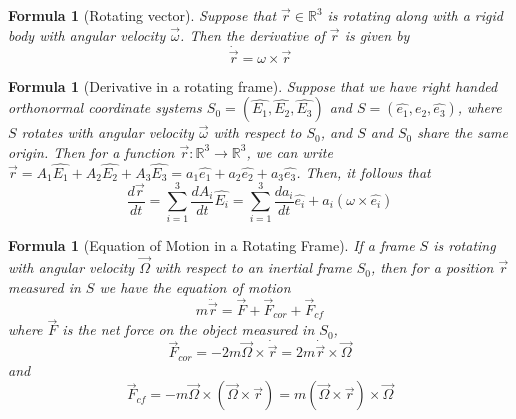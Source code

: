 \documentclass[12pt]{article}
\newtheorem{for}[thm]{Formula}
\theoremstyle{definition}
\theoremstyle{remark}
\numberwithin{equation}{section}
\newcommand\R{\mathbb R}    %
\begin{document}
\vspace{15pt}

\begin{for}[Rotating vector]
        Suppose that $\vec{r} \in \R^3$ is rotating along with a rigid body with angular velocity $\vec{\omega}$. Then the derivative of $\vec{r}$ is given by \begin{equation}
                \dot{\vec{r}} = \omega \times \vec{r}
        \end{equation}
\end{for}

\vspace{15pt}

\begin{for}[Derivative in a rotating frame]
        Suppose that we have right handed orthonormal coordinate systems $S_0 = (\hat{E_1}, \hat{E_2}, \hat{E_3})$ and $S = (\hat{e_1}, \hat{e_2}, \hat{e_3})$, where $S$ rotates with angular velocity $\vec{\omega}$ with respect to $S_0$, and $S$ and $S_0$ share the same origin. Then for a function $\vec{r}: \R^3\rightarrow \R^3$, we can write $\vec{r} = A_1\hat{E_1} + A_2\hat{E_2} + A_3\hat{E_3} = a_1\hat{e_1} + a_2\hat{e_2} + a_3\hat{e_3}$. Then, it follows that \begin{equation}
                \frac{d\vec{r}}{dt} = \sum\limits_{i=1}^3\frac{dA_i}{dt}\hat{E_i} = \sum\limits_{i=1}^3\frac{da_i}{dt}\hat{e_i} + a_i(\omega\times \hat{e_i})
        \end{equation}
\end{for}

\vspace{15pt}

\begin{for}[Equation of Motion in a Rotating Frame]
        If a frame $S$ is rotating with angular velocity $\vec{\Omega}$ with respect to an inertial frame $S_0$, then for a position $\vec{r}$ measured in $S$ we have the equation of motion \begin{equation}
                m\ddot{\vec{r}} = \vec{F} + \vec{F}_{cor} + \vec{F}_{cf}
        \end{equation}
        where $\vec{F}$ is the net force on the object measured in $S_0$, \begin{equation}
                \vec{F}_{cor} = -2m\vec{\Omega}\times \dot{\vec{r}} = 2m\dot{\vec{r}}\times \vec{\Omega}
        \end{equation}
        and \begin{equation}
                \vec{F}_{cf} = -m\vec{\Omega}\times (\vec{\Omega} \times \vec{r}) = m(\vec{\Omega} \times \vec{r})\times \vec{\Omega}
        \end{equation}
\end{for}
\end{document}
